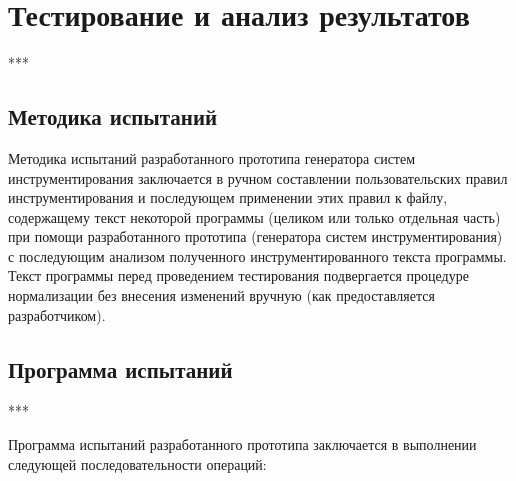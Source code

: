 \chapter{Тестирование и анализ результатов}

***

\section{Методика испытаний}

Методика испытаний разработанного прототипа генератора систем инструментирования заключается в ручном составлении пользовательских правил инструментирования и последующем применении этих правил к файлу, содержащему текст некоторой программы (целиком или только отдельная часть) при помощи разработанного прототипа (генератора систем инструментирования) с последующим анализом полученного инструментированного текста программы.
Текст программы перед проведением тестирования подвергается процедуре нормализации без внесения изменений вручную (как предоставляется разработчиком).

\section{Программа испытаний}

***

Программа испытаний разработанного прототипа заключается в выполнении следующей последовательности операций:


